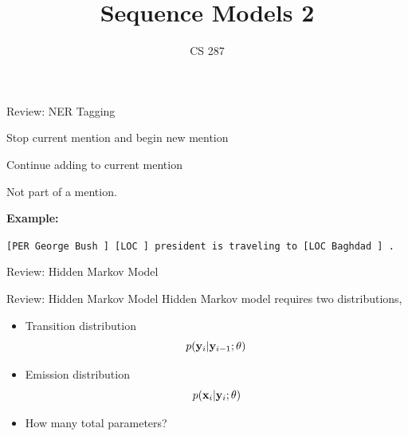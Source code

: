 \documentclass{beamer}
\title{Sequence Models 2}
\date{}
\author{CS 287}
\begin{document}
\begin{frame}
  \titlepage
\end{frame}

\begin{frame}{Review: NER Tagging}
  \begin{description} \itemsep 20pt
  \item[B-TYPE] Stop current mention and begin new mention
    \air 
  \item[I-TYPE] Continue adding to current mention
  \item[O ] Not part of a mention.
  \end{description}
  
  
  \textbf{Example:} \air

  \texttt{[PER \alert{George Bush} ]  [LOC  ] president is traveling to [LOC \alert{Baghdad} ] .  } 
\end{frame}


\begin{frame}{Review: Hidden Markov Model}
\begin{center}  
\end{center}  
\end{frame}


\begin{frame}{Review: Hidden Markov Model}
  Hidden Markov model requires two distributions,
  \begin{itemize}
  \item Transition distribution 
    \[p(\mathbf{y}_i | \mathbf{y}_{i-1}; \theta)\]
  \item Emission distribution
    \[ p(\mathbf{x}_i | \mathbf{y}_i ; \theta)\] 
  \end{itemize}


  \begin{itemize}
  \item How many total parameters?
  \end{itemize}
\end{frame}
\end{document}
